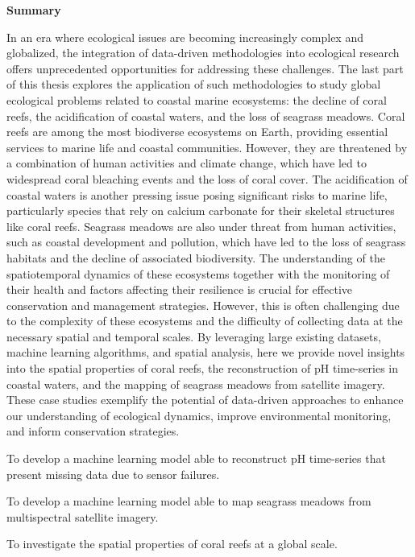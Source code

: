 \thispagestyle{empty}

\begin{center}
    \textbf{\Large Summary}
\end{center}

In an era where ecological issues are becoming increasingly complex and
globalized, the integration of data-driven methodologies into ecological
research offers unprecedented opportunities for addressing these challenges.
The last part of this thesis explores the application of such methodologies to
study global ecological problems related to coastal marine ecosystems: the
decline of coral reefs, the acidification of coastal waters, and the loss of
seagrass meadows. Coral reefs are among the most biodiverse ecosystems on
Earth, providing essential services to marine life and coastal communities.
However, they are threatened by a combination of human activities and climate
change, which have led to widespread coral bleaching events and the loss of
coral cover. The acidification of coastal waters is another pressing issue
posing significant risks to marine life, particularly species that rely on
calcium carbonate for their skeletal structures like coral reefs. Seagrass
meadows are also under threat from human activities, such as coastal
development and pollution, which have led to the loss of seagrass habitats and
the decline of associated biodiversity. The understanding of the spatiotemporal
dynamics of these ecosystems together with the monitoring of their health and
factors affecting their resilience is crucial for effective conservation and
management strategies. However, this is often challenging due to the complexity
of these ecosystems and the difficulty of collecting data at the necessary
spatial and temporal scales. By leveraging large existing datasets, machine
learning algorithms, and spatial analysis, here we provide novel insights
into the spatial properties of coral reefs, the reconstruction of pH
time-series in coastal waters, and the mapping of seagrass meadows from
satellite imagery. These case studies exemplify the potential of data-driven
approaches to enhance our understanding of ecological dynamics, improve
environmental monitoring, and inform conservation strategies.

\vspace{1cm}

\begin{objectiveslist}
    \item To develop a machine learning model able to reconstruct pH
    time-series that present missing data due to sensor failures.
    \item To develop a machine learning model able to map seagrass meadows from
    multispectral satellite imagery.
    \item To investigate the spatial properties of coral reefs at a global
    scale.
\end{objectiveslist}

